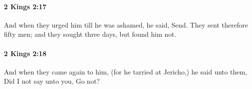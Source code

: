 		\paragraph{2 Kings 2:17} %
			\label{2KINGS-2-17}

			And when they urged him till he was ashamed, he said, Send. They sent therefore fifty men; and they sought three days, but found him not.


		\paragraph{2 Kings 2:18} %
			\label{2KINGS-2-18}

			And when they came again to him, (for he tarried at Jericho,) he said unto them, Did I not say unto you, Go not?


